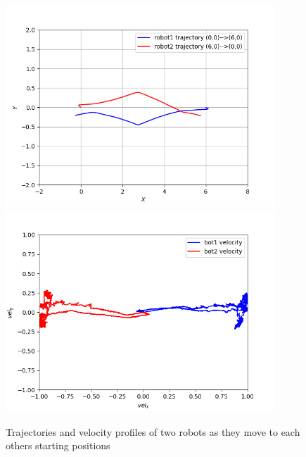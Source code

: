 \documentclass[12pt]{report}
\begin{document}
\renewcommand{\thefigure}{7}
\begin{figure}[h]
	\centering
	\includegraphics[width=0.9\textwidth]{2bot_pos.png}
	\includegraphics[width=0.9\textwidth]{2bot_vel.png}
	\caption{Trajectories and velocity profiles of two robots as they move to each others starting positions}  \label{fig:2bot}
\end{figure}
\end{document}
